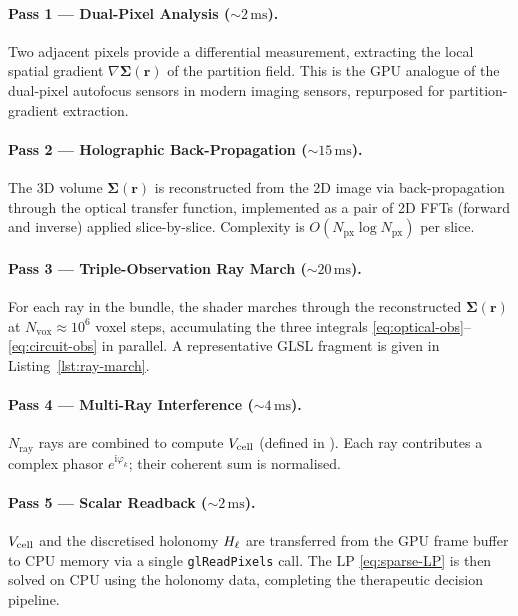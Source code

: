 \paragraph{Pass 1 — Dual-Pixel Analysis ($\sim 2\,\mathrm{ms}$).}
Two adjacent pixels provide a differential measurement, extracting the local
spatial gradient $\nabla\boldsymbol{\Sigma}(\mathbf{r})$ of the partition
field.  This is the GPU analogue of the dual-pixel autofocus sensors in modern
imaging sensors, repurposed for partition-gradient extraction.

\paragraph{Pass 2 — Holographic Back-Propagation ($\sim 15\,\mathrm{ms}$).}
The 3D volume $\boldsymbol{\Sigma}(\mathbf{r})$ is reconstructed from the 2D
image via back-propagation through the optical transfer function, implemented
as a pair of 2D FFTs (forward and inverse) applied slice-by-slice.  Complexity
is $O(N_{\mathrm{px}} \log N_{\mathrm{px}})$ per slice.

\paragraph{Pass 3 — Triple-Observation Ray March ($\sim 20\,\mathrm{ms}$).}
For each ray in the bundle, the shader marches through the reconstructed
$\boldsymbol{\Sigma}(\mathbf{r})$ at $N_{\mathrm{vox}} \approx 10^6$ voxel
steps, accumulating the three integrals
\eqref{eq:optical-obs}--\eqref{eq:circuit-obs} in parallel.  A representative
GLSL fragment is given in Listing~\ref{lst:ray-march}.

\paragraph{Pass 4 — Multi-Ray Interference ($\sim 4\,\mathrm{ms}$).}
$N_{\mathrm{ray}}$ rays are combined to compute $V_{\mathrm{cell}}$ (defined in
).  Each ray contributes a complex phasor
$e^{\mathrm{i}\varphi_k}$; their coherent sum is normalised.

\paragraph{Pass 5 — Scalar Readback ($\sim 2\,\mathrm{ms}$).}
$V_{\mathrm{cell}}$ and the discretised holonomy $H_\ell$ are transferred from the
GPU frame buffer to CPU memory via a single \texttt{glReadPixels} call.
The LP \eqref{eq:sparse-LP} is then solved on CPU using the holonomy
data, completing the therapeutic decision pipeline.

